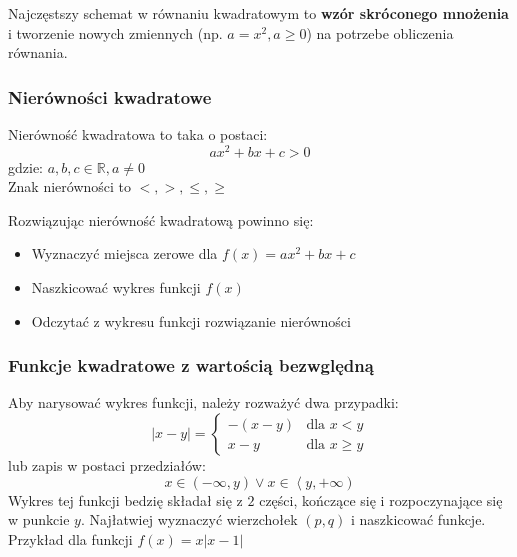 \documentclass[12pt, a4paper]{article}
\begin{document}
\noindent Najczęstszy schemat w równaniu kwadratowym to \textbf{wzór skróconego mnożenia} i
tworzenie nowych zmiennych (np. $a = x^2, a \geq 0$) na potrzebe obliczenia równania.

\subsubsection*{Nierówności kwadratowe}
Nierówność kwadratowa to taka o postaci:
$$ax^2 + bx + c > 0$$
gdzie: $a, b, c \in \mathbb{R}, a \neq 0$ \\
Znak nierówności to $<, >, \leq, \geq$ \\
\vspace{0em}

\noindent Rozwiązując nierówność kwadratową powinno się:
\begin{itemize}
  \item Wyznaczyć miejsca zerowe dla $f(x) = ax^2 + bx + c$
  \item Naszkicować wykres funkcji $f(x)$
  \item Odczytać z wykresu funkcji rozwiązanie nierówności
\end{itemize}

\subsubsection*{Funkcje kwadratowe z wartością bezwględną}
Aby narysować wykres funkcji, należy rozważyć dwa przypadki:
$$
|x-y|=
\begin{cases}
  -(x - y) & \text{dla } x < y \\
  x - y & \text{dla } x \geq y
\end{cases}
$$
lub zapis w postaci przedziałów:
$$
x \in \left(-\infty, y\right) \vee x \in \left\langle y, +\infty \right)
$$
Wykres tej funkcji bedzię składał się z $2$ części, kończące się i rozpoczynające się w punkcie $y$.
Najłatwiej wyznaczyć wierzchołek $\left(p, q\right)$ i naszkicować funkcje.
Przykład dla funkcji $f(x) = x|x-1|$
\begin{center}
\end{center}
\end{document}
